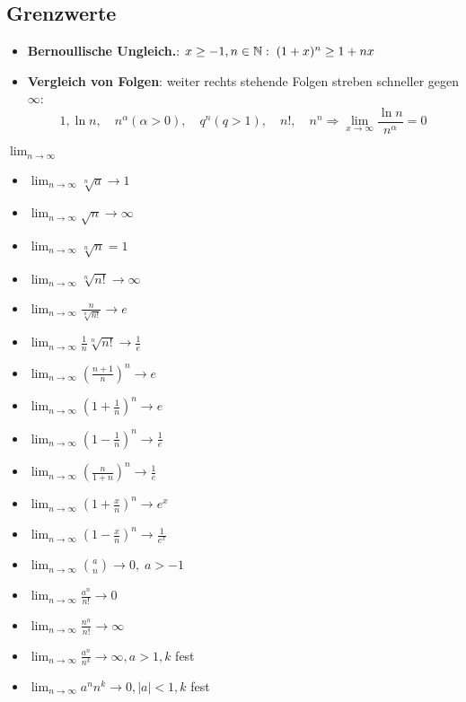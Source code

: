 \subsection{Grenzwerte}
\begin{itemize}[leftmargin=*]
	\item \textbf{Bernoullische Ungleich.}: $x \geq -1, n \in \mathbb{N}: \; (1+x)^n \geq 1+nx$
	\item \textbf{Vergleich von Folgen}: weiter rechts stehende Folgen streben
	schneller gegen $\infty$:
	\[
		1, \ln n, \quad n^\alpha (\alpha > 0), \quad q^n (q > 1), \quad n!, \quad n^n \Rightarrow
		\lim_{x \to \infty} \frac{\ln n}{n^\alpha} = 0
	\]
\end{itemize}
$\lim_{n \to \infty}$
\begin{itemize}[leftmargin=*]
	\item $\lim_{n \to \infty} \sqrt[n]{a} \rightarrow 1$
	\item $\lim_{n \to \infty} \sqrt{n} \rightarrow \infty$
	\item $\lim_{n \to \infty} \sqrt[n]{n} = 1$
	\item $\lim_{n \to \infty} \sqrt[n]{n!} \rightarrow \infty$
	\item $\lim_{n \to \infty} \frac{n}{\sqrt[n]{n!}} \rightarrow e$
	\item $\lim_{n \to \infty} \frac{1}{n} \sqrt[n]{n!} \rightarrow \frac{1}{e}$
	\item $\lim_{n \to \infty} \left ( \frac{n+1}{n} \right )^n \rightarrow e$
	\item $\lim_{n \to \infty} \left ( 1 + \frac{1}{n} \right )^n \rightarrow e$
	\item $\lim_{n \to \infty} \left ( 1 - \frac{1}{n} \right )^n \rightarrow \frac{1}{e}$
	\item $\lim_{n \to \infty} \left ( \frac{n}{1 + n} \right )^n \rightarrow \frac{1}{e}$
	\item $\lim_{n \to \infty} \left ( 1 + \frac{x}{n} \right )^n \rightarrow e^x$
	\item $\lim_{n \to \infty} \left ( 1 - \frac{x}{n} \right )^n \rightarrow \frac{1}{e^x}$
	\item $\lim_{n \to \infty} {a \choose n} \rightarrow 0, \; a > -1$
	\item $\lim_{n \to \infty} \frac{a^n}{n!} \rightarrow 0$
	\item $\lim_{n \to \infty} \frac{n^n}{n!} \rightarrow \infty$
	\item $\lim_{n \to \infty} \frac{a^n}{n^k} \rightarrow \infty, a > 1, k$ fest
	\item $\lim_{n \to \infty} a^n n^k \rightarrow 0, |a| < 1, k$ fest

\end{itemize}
